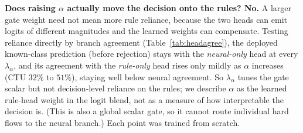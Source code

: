 \documentclass[journal]{IEEEtran}
\begin{document}
\textbf{Does raising $\alpha$ actually move the decision onto the rules? No.} A larger
gate weight need not mean more rule reliance, because the two heads can emit logits of
different magnitudes and the learned weights can compensate. Testing reliance directly by
branch agreement (Table~\ref{tab:headagree}), the deployed known-class prediction (before
rejection) stays with the
\emph{neural-only} head at every $\lambda_\alpha$, and its agreement with the
\emph{rule-only} head rises only mildly as $\alpha$ increases (CTU $32\%$ to $51\%$),
staying well below neural agreement.
So $\lambda_\alpha$ tunes the gate scalar but not decision-level reliance on the rules;
we describe $\alpha$ as the learned rule-head weight in the logit blend, not as a measure
of how interpretable the decision is. (This is also a global scalar gate, so it cannot route
individual hard flows to the neural branch.) Each point was trained from scratch.

\begin{table}[t]
\centering\small
\caption{Branch agreement across the $\lambda_\alpha$ sweep (NeSy-NIDS, mean over five
seeds): learned $\alpha$ and the fraction of flows on which the deployed known-class prediction
(before rejection) equals the neural-only (dep$=$neural) or rule-only (dep$=$rule) prediction. The
open-set rejection score is computed on the hard rule vector, so these figures do not measure the
rules' influence on rejection.}
\label{tab:headagree}
\setlength{\tabcolsep}{4pt}
\end{table}
\end{document}
